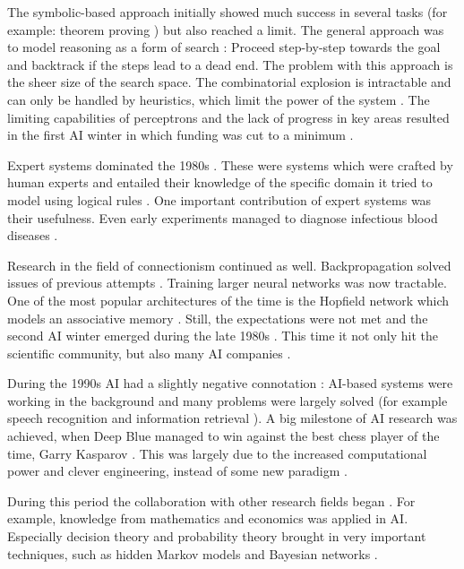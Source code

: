 \documentclass[draft,final,oneside]{vutinfth} %
\begin{document}
The symbolic-based approach initially showed much success in several tasks (for example: theorem proving \cite{aimodern}) but also reached a limit. The general approach was to model reasoning as a form of search \cite{aimodern}: Proceed step-by-step towards the goal and backtrack if the steps lead to a dead end. The problem with this approach is the sheer size of the search space. The combinatorial explosion is intractable and can only be handled by heuristics, which limit the power of the system \cite{aimodern}. The limiting capabilities of perceptrons and the lack of progress in key areas resulted in the first AI winter in which funding was cut to a minimum \cite{crevier}.

Expert systems dominated the 1980s \cite{machineswhothink}. These were systems which were crafted by human experts and entailed their knowledge of the specific domain it tried to model using logical rules \cite{questforai}. One important contribution of expert systems was their usefulness. Even early experiments managed to diagnose infectious blood diseases \cite{questforai}. 

Research in the field of connectionism continued as well. Backpropagation solved issues of previous attempts \cite{questforai}\cite{aimodern}. Training larger neural networks was now tractable. One of the most popular architectures of the time is the Hopfield network which models an associative memory \cite{anintroductiontoneuralnetworks}. Still, the expectations were not met and the second AI winter emerged during the late 1980s \cite{machineswhothink}. This time it not only hit the scientific community, but also many AI companies \cite{questforai}.

During the 1990s AI had a slightly negative connotation \cite{avoidai}: AI-based systems were working in the background and many problems were largely solved (for example speech recognition and information retrieval \cite{avoidai}\cite{historyinformationretrieval}). A big milestone of AI research was achieved, when Deep Blue managed to win against the best chess player of the time, Garry Kasparov \cite{questforai}. This was largely due to the increased computational power and clever engineering, instead of some new paradigm \cite{questforai}.

During this period the collaboration with other research fields began \cite{aimodern}. For example, knowledge from mathematics and economics was applied in AI. Especially decision theory and probability theory brought in very important techniques, such as hidden Markov models and Bayesian networks \cite{statisticsinml}\cite{aimodern}.
\end{document}
